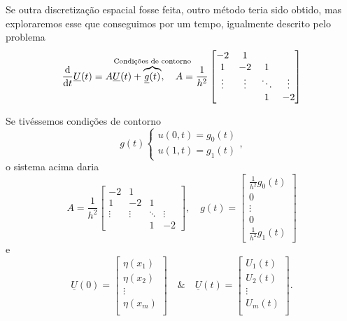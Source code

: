 \documentclass[../differential_methods.tex]{subfiles}
\begin{document}
Se outra discretização espacial fosse feita, outro método teria sido obtido, mas exploraremos esse que conseguimos por um tempo, igualmente descrito pelo problema
\[
	\frac{\mathrm{d}}{\mathrm{d}t} \underline{U}(t) = A \underline{U}(t) + \overbrace{\underline{g}(t)}^{\mathclap{\text{Condições de contorno}}}, \quad A = \frac{1}{h^{2}}\begin{bmatrix}
		-2     & 1      &        &        \\
		1      & -2     & 1      &        \\
		\vdots & \vdots & \ddots & \vdots \\
		       &        & 1      & -2
	\end{bmatrix}
\]
\begin{example}
	Se tivéssemos condições de contorno
	\[
		g(t)\left\{\begin{array}{ll}
			u(0, t) = g_{0}(t) \\
			u(1, t) = g_1(t)
		\end{array}\right.,
	\]
	o sistema acima daria
	\[
		A = \frac{1}{h^{2}}\begin{bmatrix}
			-2     & 1      &        &        \\
			1      & -2     & 1      &        \\
			\vdots & \vdots & \ddots & \vdots \\
			       &        & 1      & -2
		\end{bmatrix}, \quad
		g(t) = \begin{bmatrix}
			\frac{1}{h^{2}}g_{0}(t) \\
			0                       \\
			\vdots                  \\
			0                       \\
			\frac{1}{h^{2}}g_1(t)
		\end{bmatrix}
	\]
	e
	\[
		\underline{U}(0) = \begin{bmatrix}
			\eta (x_1) \\
			\eta (x_2) \\
			\vdots     \\
			\eta (x_m) \\
		\end{bmatrix} \quad\&\quad \underline{U}(t) = \begin{bmatrix}
			U_1(t)   \\
			U_2(t)   \\
			\vdots   \\
			U_{m}(t) \\
		\end{bmatrix}.
	\]
\end{example}
\end{document}
